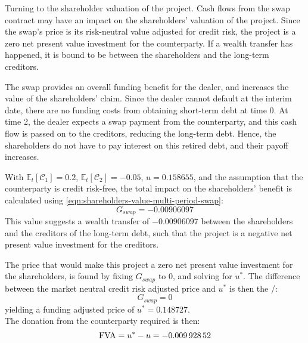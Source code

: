 \documentclass[main.tex]{subfiles}
\begin{document}
            Turning to the shareholder valuation of the project.
            Cash flows from the swap contract may have an impact on the shareholders' valuation of the project.
            Since the swap's price is its risk-neutral value adjusted for credit risk,
            the project is a zero net present value investment for the counterparty.
            If a wealth transfer has happened, it is bound to be between the shareholders and the long-term creditors.

            The swap provides an overall funding benefit for the dealer,
            and increases the value of the shareholders' claim.
            Since the dealer cannot default at the interim date,
            there are no funding costs from obtaining short-term debt at time 0.
            At time 2, the dealer expects a swap payment from the counterparty,
            and this cash flow is passed on to the creditors, reducing the long-term debt.
            Hence, the shareholders do not have to pay interest on this retired debt,
            and their payoff increases.
            
            With $\mathbb{E}_{t}\left[\mathcal{C}_1\right]=\num{0.2}$,
            $\mathbb{E}_{t}\left[\mathcal{C}_2\right]=\num{-0.05}$,
            $u=\num{0.158655}$,
            and the assumption that the counterparty is credit risk-free,
            the total impact on the shareholders' benefit is calculated using \cref{eqn:shareholders-value-multi-period-swap}:
            \begin{equation}
                G_{swap} = \num{-0.00906097}
            \end{equation}
            This value suggests a wealth transfer of $\num{-0.00906097}$
            between the shareholders and the creditors of the long-term debt,
            such that the project is a negative net present value investment for the creditors.

            The price that would make this project a zero net present value investment for the shareholders,
            is found by fixing $G_{swap}$ to 0,
            and solving for $u^{\ast}$.
            The difference between the market neutral credit risk adjusted price and $u^{\ast}$ is then the \FVA/:
            \begin{equation}
                G_{swap} = 0
            \end{equation}
            yielding a funding adjusted price of $u^{\ast} = \num{0.148727}$.
            \\
            The donation from the counterparty required is then:
            \begin{equation}
                \FVA/ = u^{\ast} - u = \num{-0.00992852}
            \end{equation}
\end{document}
